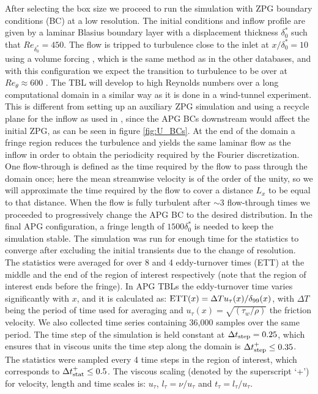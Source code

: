 After selecting the box size we proceed to run the simulation with ZPG boundary conditions (BC) at a low resolution. The initial conditions and inflow profile are given by a laminar Blasius boundary layer with a displacement thickness $\delta^*_0$ such that $Re_{\delta_0^*}=450$. The flow is tripped to turbulence close to the inlet at $x/\delta^*_0=10$ using a volume forcing \citep{schlatter_orlu_2012}, which is the same method as in the other databases, and with this configuration we expect the transition to turbulence to be over at $Re_{\theta}\approx 600$ \citep{E-AmorZPG, schlatter_orlu_2012}. The TBL will develop to high Reynolds numbers over a long computational domain in a similar way as it is done in a wind-tunnel experiment. This is different from setting up an auxiliary ZPG simulation and using a recycle plane for the inflow as used in \cite{Kitsios2016, Kitsios2017, Gungor_DNS_2017}, since the APG BCs downstream would affect the initial ZPG, as can be seen in figure \ref{fig:U_BCs}. At the end of the domain a fringe region \citep{SIMSON_fringe} reduces the turbulence and yields the same laminar flow as the inflow in order to obtain the periodicity required by the Fourier discretization. 
One flow-through is defined as the time required by the flow to pass through the domain once; here the mean streamwise velocity is of the order of the unity, so we will approximate the time required by the flow to cover a distance $L_x$ to be equal to that distance. When the flow is fully turbulent after $\sim3$ flow-through times we proceeded to progressively change the APG BC to the desired distribution. In the final APG configuration, a fringe length of $1500 \delta^*_0$ is needed to keep the simulation stable.
The simulation was run for enough time for the statistics to converge \citep{vinuesa2016_mec} after excluding the initial transients due to the change of resolution. 
The statistics were averaged for over 8 and 4 eddy-turnover times (ETT) at the middle and the end of the region of interest respectively (note that the region of interest ends before the fringe). In APG TBLs the eddy-turnover time varies significantly with $x$, and it is calculated as: $ {\rm ETT}(x) = \Delta T  u_{\tau}(x) / \delta_{99}(x)$, with $\Delta T$ being the period of time used for averaging and $u_{\tau}(x)=\sqrt{(\tau_w / \rho)}$ the friction velocity.
We also collected time series containing 36,000 samples over the same period. 
The time step of the simulation is held constant at $\Delta t_{\rm step}=0.25$, which ensures that in viscous units the time step along the domain is $\Delta t_{\rm step}^+ \leq 0.35$. The statistics were sampled every 4 time steps in the region of interest, which corresponds to $\Delta t_{\rm stat}^+ \leq 0.5$.
The viscous scaling (denoted by the superscript `+') for velocity, length and time scales is:  $u_{\tau}$, $l_{\tau}=\nu/u_{\tau}$ and $t_{\tau}=l_{\tau}/u_{\tau}$.

